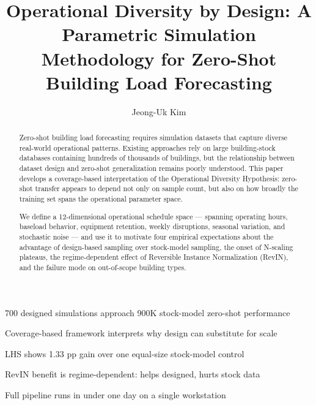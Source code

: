 \documentclass[preprint,12pt,authoryear]{elsarticle}
\begin{document}
\begin{frontmatter}

\title{Operational Diversity by Design: A Parametric Simulation Methodology for Zero-Shot Building Load Forecasting}

\author[smu]{Jeong-Uk Kim}


\begin{highlights}
\item 700 designed simulations approach 900K stock-model zero-shot performance
\item Coverage-based framework interprets why design can substitute for scale
\item LHS shows 1.33 pp gain over one equal-size stock-model control
\item RevIN benefit is regime-dependent: helps designed, hurts stock data
\item Full pipeline runs in under one day on a single workstation
\end{highlights}

\begin{abstract}
Zero-shot building load forecasting requires simulation datasets that capture diverse real-world operational patterns. Existing approaches rely on large building-stock databases containing hundreds of thousands of buildings, but the relationship between dataset design and zero-shot generalization remains poorly understood. This paper develops a coverage-based interpretation of the Operational Diversity Hypothesis: zero-shot transfer appears to depend not only on sample count, but also on how broadly the training set spans the operational parameter space.

We define a 12-dimensional operational schedule space --- spanning operating hours, baseload behavior, equipment retention, weekly disruptions, seasonal variation, and stochastic noise --- and use it to motivate four empirical expectations about the advantage of design-based sampling over stock-model sampling, the onset of N-scaling plateaus, the regime-dependent effect of Reversible Instance Normalization (RevIN), and the failure mode on out-of-scope building types.


\end{abstract}
\end{frontmatter}
\end{document}
